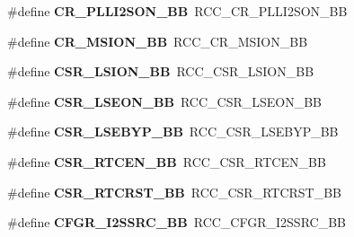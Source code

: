 \begin{DoxyCompactItemize}
\item 
\hypertarget{group___h_a_l___r_c_c___aliased_ga0c0fb27aba4eb660f7590252596bdfc5}{\#define {\bfseries C\-R\-\_\-\-P\-L\-L\-I2\-S\-O\-N\-\_\-\-B\-B}~R\-C\-C\-\_\-\-C\-R\-\_\-\-P\-L\-L\-I2\-S\-O\-N\-\_\-\-B\-B}\label{group___h_a_l___r_c_c___aliased_ga0c0fb27aba4eb660f7590252596bdfc5}

\item 
\hypertarget{group___h_a_l___r_c_c___aliased_gac80b5fd1d6f839cc29c9272d47742907}{\#define {\bfseries C\-R\-\_\-\-M\-S\-I\-O\-N\-\_\-\-B\-B}~R\-C\-C\-\_\-\-C\-R\-\_\-\-M\-S\-I\-O\-N\-\_\-\-B\-B}\label{group___h_a_l___r_c_c___aliased_gac80b5fd1d6f839cc29c9272d47742907}

\item 
\hypertarget{group___h_a_l___r_c_c___aliased_gaa253e36e7e5fb02998c0e4d0388abc52}{\#define {\bfseries C\-S\-R\-\_\-\-L\-S\-I\-O\-N\-\_\-\-B\-B}~R\-C\-C\-\_\-\-C\-S\-R\-\_\-\-L\-S\-I\-O\-N\-\_\-\-B\-B}\label{group___h_a_l___r_c_c___aliased_gaa253e36e7e5fb02998c0e4d0388abc52}

\item 
\hypertarget{group___h_a_l___r_c_c___aliased_ga213e54878ac3849d9ea59567cf73bac2}{\#define {\bfseries C\-S\-R\-\_\-\-L\-S\-E\-O\-N\-\_\-\-B\-B}~R\-C\-C\-\_\-\-C\-S\-R\-\_\-\-L\-S\-E\-O\-N\-\_\-\-B\-B}\label{group___h_a_l___r_c_c___aliased_ga213e54878ac3849d9ea59567cf73bac2}

\item 
\hypertarget{group___h_a_l___r_c_c___aliased_gac7c26259006de79c8754693af9712d1a}{\#define {\bfseries C\-S\-R\-\_\-\-L\-S\-E\-B\-Y\-P\-\_\-\-B\-B}~R\-C\-C\-\_\-\-C\-S\-R\-\_\-\-L\-S\-E\-B\-Y\-P\-\_\-\-B\-B}\label{group___h_a_l___r_c_c___aliased_gac7c26259006de79c8754693af9712d1a}

\item 
\hypertarget{group___h_a_l___r_c_c___aliased_gac3641969630c9b8eb0f5da2f164a5892}{\#define {\bfseries C\-S\-R\-\_\-\-R\-T\-C\-E\-N\-\_\-\-B\-B}~R\-C\-C\-\_\-\-C\-S\-R\-\_\-\-R\-T\-C\-E\-N\-\_\-\-B\-B}\label{group___h_a_l___r_c_c___aliased_gac3641969630c9b8eb0f5da2f164a5892}

\item 
\hypertarget{group___h_a_l___r_c_c___aliased_ga55aab5ed906bf71760d81cc5acefd55c}{\#define {\bfseries C\-S\-R\-\_\-\-R\-T\-C\-R\-S\-T\-\_\-\-B\-B}~R\-C\-C\-\_\-\-C\-S\-R\-\_\-\-R\-T\-C\-R\-S\-T\-\_\-\-B\-B}\label{group___h_a_l___r_c_c___aliased_ga55aab5ed906bf71760d81cc5acefd55c}

\item 
\hypertarget{group___h_a_l___r_c_c___aliased_ga9076f5ddbb262fd45584702f5d280c9e}{\#define {\bfseries C\-F\-G\-R\-\_\-\-I2\-S\-S\-R\-C\-\_\-\-B\-B}~R\-C\-C\-\_\-\-C\-F\-G\-R\-\_\-\-I2\-S\-S\-R\-C\-\_\-\-B\-B}\label{group___h_a_l___r_c_c___aliased_ga9076f5ddbb262fd45584702f5d280c9e}


\end{DoxyCompactItemize}
